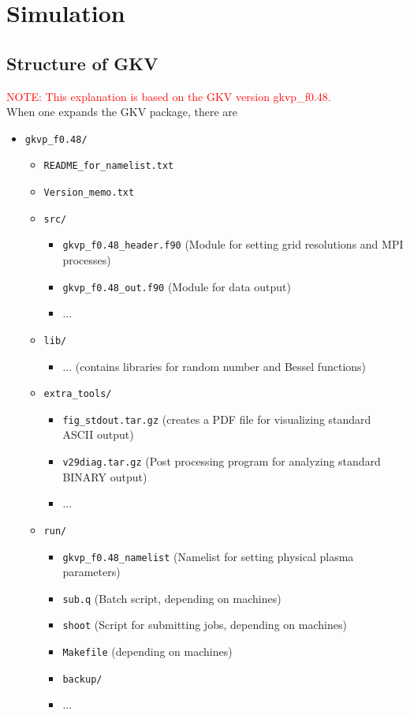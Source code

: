 \chapter{Simulation}
\label{chap:Simulation}

\section{Structure of GKV}
\label{sec:Structure of GKV}
\textcolor{red}{NOTE: This explanation is based on the GKV version gkvp\_f0.48.}\\
When one expands the GKV package, there are 
\begin{itemize}
  \item \texttt{gkvp\_f0.48/}
  \begin{itemize}
    \item \texttt{README\_for\_namelist.txt}
    \item \texttt{Version\_memo.txt}
    \item \texttt{src/}
    \begin{itemize}
      \item \texttt{gkvp\_f0.48\_header.f90} (Module for setting grid resolutions and MPI processes)
      \item \texttt{gkvp\_f0.48\_out.f90} (Module for data output)
      \item ...
    \end{itemize}
    \item \texttt{lib/}
    \begin{itemize}
      \item ...  (contains libraries for random number and Bessel functions)
    \end{itemize}
    \item \texttt{extra\_tools/}
    \begin{itemize}
      \item \texttt{fig\_stdout.tar.gz} (creates a PDF file for visualizing standard ASCII output)
      \item \texttt{v29diag.tar.gz} (Post processing program for analyzing standard BINARY output)
      \item ...
    \end{itemize}
    \item \texttt{run/}
    \begin{itemize}
      \item \texttt{gkvp\_f0.48\_namelist} (Namelist for setting physical plasma parameters)
      \item \texttt{sub.q} (Batch script, depending on machines)
      \item \texttt{shoot} (Script for submitting jobs, depending on machines)
      \item \texttt{Makefile} (depending on machines)
      \item \texttt{backup/}
      \item ...
    \end{itemize}
  \end{itemize}
\end{itemize}





